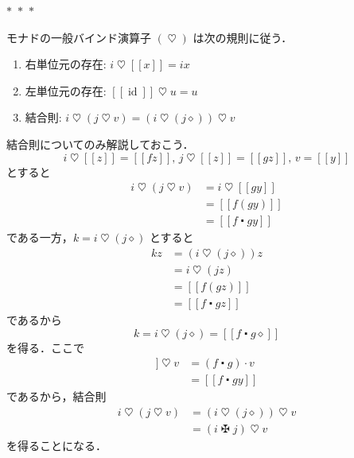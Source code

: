 \documentclass[a5paper,twoside,fleqn,draft]{jsbook}
\def\[{[\![}
\def\]{]\!]}
\newcommand{\separator}{\begin{center}$*$~$*$~$*$\end{center}}
\newcommand{\mAnonParam}{\diamond}
\newcommand{\mSpecialFunc}[1]{\mathrm{#1}}
\DeclareMathOperator{\mId}{\mSpecialFunc{id}}
\DeclareMathOperator{\mBind}{\heartsuit}
\DeclareMathOperator{\mBindComp}{\maltese}
\DeclareMathOperator{\mCompFunc}{\centerdot}
\DeclareMathOperator{\mMap}{\cdot}
\newcommand{\mPureWith}[1]{\[#1\]}
\begin{document}
\separator

モナドの一般バインド演算子 $(\mBind)$ は次の規則に従う．
\begin{enumerate}
\item 右単位元の存在: $i\mBind{}\mPureWith{x}=ix$
\item 左単位元の存在: $\mPureWith{\mId}\mBind u=u$
\item 結合則: $i\mBind{}(j\mBind v)=(i\mBind{}(j\mAnonParam))\mBind v$
\end{enumerate}

結合則についてのみ解説しておこう．
\begin{equation}
i\mBind\mPureWith{z}=\mPureWith{fz},\,
j\mBind\mPureWith{z}=\mPureWith{gz},\,
v=\mPureWith{y}
\end{equation}
とすると
\begin{align}
i\mBind(j\mBind v)&=i\mBind\mPureWith{gy}\\
&=\mPureWith{f(gy)}\\
&=\mPureWith{f\mCompFunc gy}
\end{align}
である一方，$k=i\mBind{}(j\mAnonParam)$ とすると
\begin{align}
kz&=(i\mBind(j\mAnonParam))z\\
&=i\mBind(jz)\\
&=\mPureWith{f(gz)}\\
&=\mPureWith{f\mCompFunc gz}
\end{align}
であるから
\begin{equation}
k=i\mBind{}(j\mAnonParam)=\mPureWith{f\mCompFunc g\mAnonParam}
\end{equation}
を得る．ここで
\begin{align}
\mPureWith{f\mCompFunc g\mAnonParam}\mBind v
&=(f\mCompFunc g)\mMap v\\
&=\mPureWith{f\mCompFunc gy}
\end{align}
であるから，結合則
\begin{align}
  i\mBind{}(j\mBind v)
  &=(i\mBind{}(j\mAnonParam))\mBind v\\
  &=(i\mBindComp j)\mBind v
\end{align}
を得ることになる．
\end{document}
